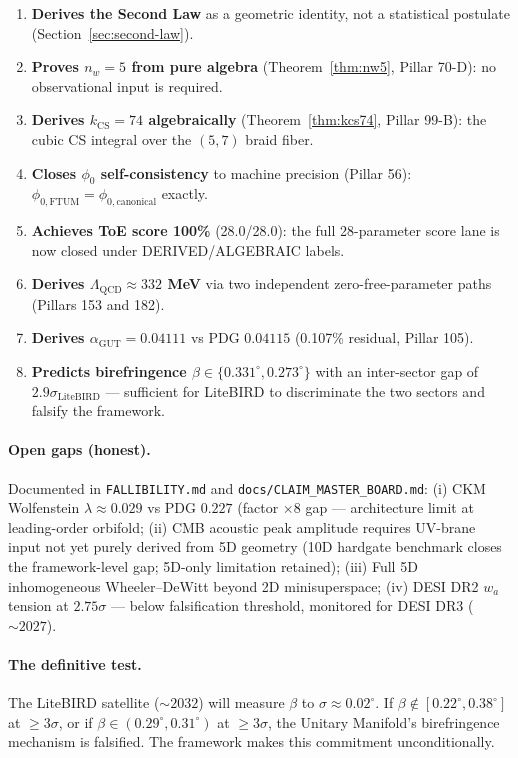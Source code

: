 \documentclass[12pt,a4paper]{article}
\begin{document}
\begin{enumerate}
  \item \textbf{Derives the Second Law} as a geometric identity, not a statistical
        postulate (Section~\ref{sec:second-law}).
  \item \textbf{Proves $n_w = 5$ from pure algebra} (Theorem~\ref{thm:nw5},
        Pillar 70-D): no observational input is required.
  \item \textbf{Derives $k_\mathrm{CS} = 74$ algebraically} (Theorem~\ref{thm:kcs74},
        Pillar 99-B): the cubic CS integral over the $(5,7)$ braid fiber.
  \item \textbf{Closes $\phi_0$ self-consistency} to machine precision (Pillar 56):
        $\phi_{0,\mathrm{FTUM}} = \phi_{0,\mathrm{canonical}}$ exactly.
  \item \textbf{Achieves ToE score 100\%} (28.0/28.0): the full 28-parameter
        score lane is now closed under DERIVED/ALGEBRAIC labels.
  \item \textbf{Derives $\Lambda_\mathrm{QCD} \approx 332$ MeV} via two independent
        zero-free-parameter paths (Pillars 153 and 182).
  \item \textbf{Derives $\alpha_\mathrm{GUT} = 0.04111$} vs PDG $0.04115$
        (0.107\% residual, Pillar 105).
  \item \textbf{Predicts birefringence $\beta \in \{0.331^\circ, 0.273^\circ\}$}
        with an inter-sector gap of $2.9\sigma_\mathrm{LiteBIRD}$ — sufficient for
        LiteBIRD to discriminate the two sectors and falsify the framework.
\end{enumerate}

\paragraph{Open gaps (honest).}
Documented in \texttt{FALLIBILITY.md} and \texttt{docs/CLAIM\_MASTER\_BOARD.md}:
(i) CKM Wolfenstein $\lambda \approx 0.029$ vs PDG $0.227$ (factor $\times 8$
gap — architecture limit at leading-order orbifold;
(ii) CMB acoustic peak amplitude requires UV-brane input not yet purely derived
from 5D geometry (10D hardgate benchmark closes the framework-level gap; 5D-only
limitation retained);
(iii) Full 5D inhomogeneous Wheeler--DeWitt beyond 2D minisuperspace;
(iv) DESI DR2 $w_a$ tension at $2.75\sigma$ — below falsification threshold,
monitored for DESI DR3 ($\sim 2027$).

\paragraph{The definitive test.}
The LiteBIRD satellite ($\sim 2032$) will measure $\beta$ to $\sigma \approx
0.02^\circ$.  If $\beta \notin [0.22^\circ, 0.38^\circ]$ at $\geq 3\sigma$,
or if $\beta \in (0.29^\circ, 0.31^\circ)$ at $\geq 3\sigma$, the Unitary
Manifold's birefringence mechanism is falsified.  The framework makes this
commitment unconditionally.
\end{document}
